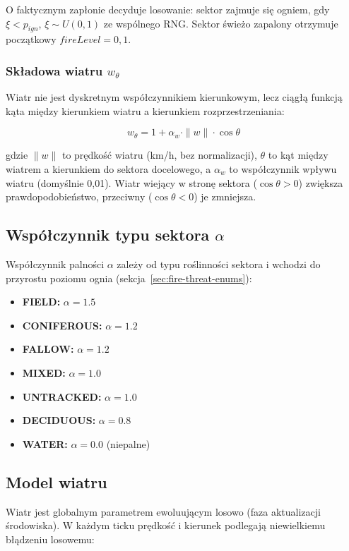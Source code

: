 O faktycznym zapłonie decyduje losowanie: sektor zajmuje się ogniem, gdy $\xi < p_{ign}$, $\xi \sim U(0,1)$ ze wspólnego RNG. Sektor świeżo zapalony otrzymuje początkowy $fireLevel = 0{,}1$.

\subsubsection*{Składowa wiatru $w_{\theta}$}

Wiatr nie jest dyskretnym współczynnikiem kierunkowym, lecz ciągłą funkcją kąta między kierunkiem wiatru a kierunkiem rozprzestrzeniania:

\begin{equation}
w_{\theta} = 1 + \alpha_{w} \cdot \|w\| \cdot \cos\theta
\end{equation}

gdzie $\|w\|$ to prędkość wiatru (km/h, bez normalizacji), $\theta$ to kąt między wiatrem a kierunkiem do sektora docelowego, a $\alpha_{w}$ to współczynnik wpływu wiatru (domyślnie 0,01). Wiatr wiejący w stronę sektora ($\cos\theta > 0$) zwiększa prawdopodobieństwo, przeciwny ($\cos\theta < 0$) je zmniejsza.

\subsection{Współczynnik typu sektora $\alpha$}
\label{sec:alpha}

Współczynnik palności $\alpha$ zależy od typu roślinności sektora i wchodzi do przyrostu poziomu ognia (sekcja~\ref{sec:fire-threat-enums}):
\begin{itemize}
    \item \textbf{FIELD:} $\alpha = 1.5$
    \item \textbf{CONIFEROUS:} $\alpha = 1.2$
    \item \textbf{FALLOW:} $\alpha = 1.2$
    \item \textbf{MIXED:} $\alpha = 1.0$
    \item \textbf{UNTRACKED:} $\alpha = 1.0$
    \item \textbf{DECIDUOUS:} $\alpha = 0.8$
    \item \textbf{WATER:} $\alpha = 0.0$ (niepalne)
\end{itemize}

\subsection{Model wiatru}

Wiatr jest globalnym parametrem ewoluującym losowo (faza aktualizacji środowiska). W każdym ticku prędkość i kierunek podlegają niewielkiemu błądzeniu losowemu:


